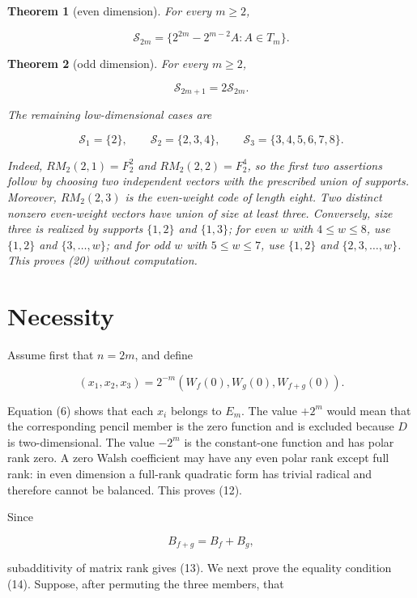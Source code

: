 \documentclass[11pt]{article}
\newtheorem{theorem}{Theorem}[section]
\theoremstyle{remark}
\begin{document}
\begin{theorem}[even dimension]

For every $m\ge 2$,

\[
\boxed{
\mathcal S_{2m}
=\{2^{2m}-2^{m-2}A:A\in T_m\}.
}
\tag{18}
\]

\end{theorem}
\begin{theorem}[odd dimension]

For every $m\ge 2$,

\[
\boxed{\mathcal S_{2m+1}=2\mathcal S_{2m}.}
\tag{19}
\]

The remaining low-dimensional cases are

\[
\mathcal S_1=\{2\},\qquad
\mathcal S_2=\{2,3,4\},\qquad
\mathcal S_3=\{3,4,5,6,7,8\}.
\tag{20}
\]

Indeed, $RM_2(2,1)=F_2^2$ and $RM_2(2,2)=F_2^4$, so the first two assertions follow by choosing two independent vectors with the prescribed union of supports. Moreover, $RM_2(2,3)$ is the even-weight code of length eight. Two distinct nonzero even-weight vectors have union of size at least three. Conversely, size three is realized by supports $\{1,2\}$ and $\{1,3\}$; for even $w$ with $4\le w\le 8$, use $\{1,2\}$ and $\{3,\ldots,w\}$; and for odd $w$ with $5\le w\le 7$, use $\{1,2\}$ and $\{2,3,\ldots,w\}$. This proves (20) without computation.

\end{theorem}
\section{Necessity}

Assume first that $n=2m$, and define

\[
(x_1,x_2,x_3)
=2^{-m}(W_f(0),W_g(0),W_{f+g}(0)).
\tag{21}
\]

Equation (6) shows that each $x_i$ belongs to $E_m$. The value $+2^m$ would mean that the corresponding pencil member is the zero function and is excluded because $D$ is two-dimensional. The value $-2^m$ is the constant-one function and has polar rank zero. A zero Walsh coefficient may have any even polar rank except full rank: in even dimension a full-rank quadratic form has trivial radical and therefore cannot be balanced. This proves (12).

Since

\[
B_{f+g}=B_f+B_g,
\]

subadditivity of matrix rank gives (13). We next prove the equality condition (14). Suppose, after permuting the three members, that
\end{document}
